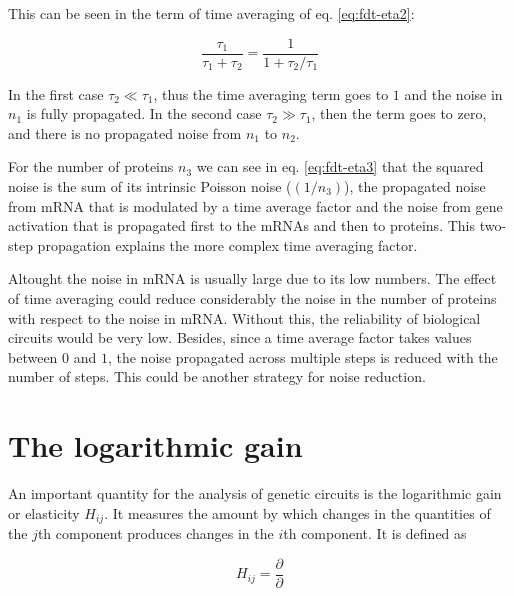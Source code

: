 This can be seen in the term of time averaging of eq. \eqref{eq:fdt-eta2}:

\begin{equation*}
  \frac{\tau_1}{\tau_1+\tau_2} = \frac{1}{1+\tau_2/\tau_1}
\end{equation*}

In the first case $\tau_2\ll\tau_1$, thus the time averaging term goes to $1$ and the noise in $n_1$ is fully propagated. In the second case $\tau_2\gg\tau_1$, then the term goes to zero, and there is no propagated noise from $n_1$ to $n_2$.


For the number of proteins $n_3$ we can see in eq. \eqref{eq:fdt-eta3} that the squared noise is the sum of its intrinsic Poisson noise ($(1/n_3)$), the propagated noise from mRNA that is modulated by a time average factor and the noise from gene activation that is propagated first to the mRNAs and then to proteins. This two-step propagation explains the more complex time averaging factor.

Altought the noise in mRNA is usually large due to its low numbers. The effect of time averaging could reduce considerably the noise in the number of proteins with respect to the noise in mRNA. Without this, the reliability of biological circuits would be very low. Besides, since a time average factor takes values between $0$ and $1$, the noise propagated across multiple steps is reduced with the number of steps. This could be another strategy for noise reduction.

\section{The logarithmic gain}
\label{sec:log_gain}
An important quantity for the analysis of genetic circuits is the logarithmic gain or elasticity $H_{ij}$. It measures the amount by which changes in the quantities of the $j$th component produces changes in the $i$th component. It is defined as

\begin{equation*}
  H_{ij} = \frac{\partial }{\partial}
\end{equation*}
